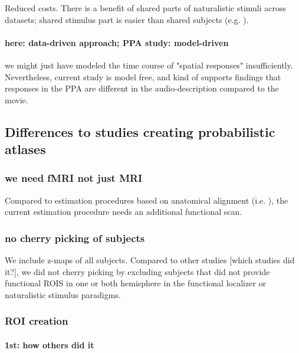 %
Reduced costs.
%
There is a benefit of shared parts of naturalistic stimuli across datasets;
shared stimulus part is easier than shared subjects (e.g.
\citep{zhang2018transfer}).


\paragraph{here: data-driven approach; PPA study: model-driven}
%
we might just have modeled the time course of "spatial responses"
insufficiently.
%
Nevertheless, current study is model free, and kind of supports findings that
responses in the PPA are different in the audio-description compared to the
movie.



\subsection{Differences to studies creating probabilistic atlases}

\subsubsection{we need fMRI not just MRI}

%
Compared to estimation procedures based on anatomical alignment (i.e.
\citep{weiner2018defining}), the current estimation procedure needs an
additional functional scan.


\subsubsection{no cherry picking of subjects}

%
We include z-maps of all subjects.
%
Compared to other studies [which studies did it?], we did not cherry picking by
excluding subjects that did not provide functional ROIS in one or both
hemisphere in the functional localizer or naturalistic stimulus paradigms.




\subsubsection{ROI creation}


\paragraph{1st: how others did it}


